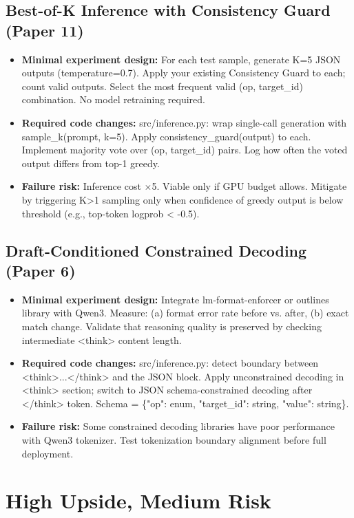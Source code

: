 \documentclass[pdflatex,sn-mathphys-num]{sn-jnl}
\theoremstyle{thmstyleone}
\theoremstyle{thmstyletwo}
\theoremstyle{thmstylethree}
\begin{document}
\subsection{Best-of-K Inference with Consistency Guard (Paper 11)}
\begin{itemize}
\item \textbf{Minimal experiment design:} For each test sample, generate K=5 JSON outputs (temperature=0.7). Apply your existing Consistency Guard to each; count valid outputs. Select the most frequent valid (op, target\_id) combination. No model retraining required.
\item \textbf{Required code changes:} src/inference.py: wrap single-call generation with sample\_k(prompt, k=5). Apply consistency\_guard(output) to each. Implement majority vote over (op, target\_id) pairs. Log how often the voted output differs from top-1 greedy.
\item \textbf{Failure risk:} Inference cost $\times$5. Viable only if GPU budget allows. Mitigate by triggering K>1 sampling only when confidence of greedy output is below threshold (e.g., top-token logprob < -0.5).
\end{itemize}

\subsection{Draft-Conditioned Constrained Decoding (Paper 6)}
\begin{itemize}
\item \textbf{Minimal experiment design:} Integrate lm-format-enforcer or outlines library with Qwen3. Measure: (a) format error rate before vs. after, (b) exact match change. Validate that reasoning quality is preserved by checking intermediate <think> content length.
\item \textbf{Required code changes:} src/inference.py: detect boundary between <think>...</think> and the JSON block. Apply unconstrained decoding in <think> section; switch to JSON schema-constrained decoding after </think> token. Schema = \{"op": enum, "target\_id": string, "value": string\}.
\item \textbf{Failure risk:} Some constrained decoding libraries have poor performance with Qwen3 tokenizer. Test tokenization boundary alignment before full deployment.
\end{itemize}

\section{High Upside, Medium Risk}
\end{document}
